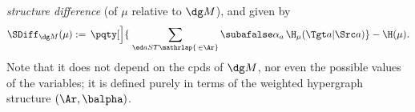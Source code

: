 \emph{structure difference}
(of $\mu$ relative to $\dg M$), 
and given by
\vspace{-0.5ex}
\begin{equation*}
    \SDiff_{\dg M}(\mu) := \,
        \pqty[\Big]{\; \sum_{\ed aST \mathrlap{\,\in \Ar}}\subafalse \alpha_a\, \H_\mu(\Tgt a | \Src a) } - \H(\mu).
    \vspace{-0.5ex}
\end{equation*}
Note that
it
does not depend on the cpds
of $\dg M$, nor even the possible values of the 
variables; it
is defined purely in terms of
the weighted hypergraph structure $(\Ar,\balpha)$.


